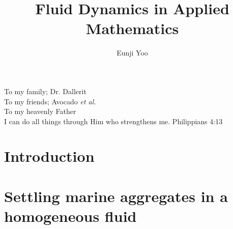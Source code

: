 \documentclass[11pt,oneside,chapterheads]{UCMerced}
\theoremstyle{plain}%
\theoremstyle{definition}
\begin{document}
\title{Fluid Dynamics in Applied Mathematics}
\author{Eunji Yoo}


\begin{frontmatter}
\makefrontmatter %

\tableofcontents
\listoffigures
\listoftables

\begin{dedication}
    To my family; Dr. Dallerit 
    \\
    To my friends; Avocado \textit{et al.}
    \\
    To my heavenly Father 
    \\
    I can do all things through Him who strengthens me. Philippians 4:13 
\end{dedication}

\begin{acknowledgements} 
    
\end{acknowledgements}

% 

\begin{abstract}  
    
\end{abstract}

\end{frontmatter}

\chapter{Introduction}
\label{ch:intro}


\chapter{Settling marine aggregates in a homogeneous fluid}
\label{ch:2}

\end{document}
